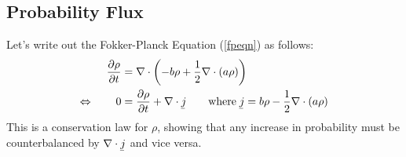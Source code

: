 \documentclass[12pt]{article}
\theoremstyle{plain}
\theoremstyle{definition}
\theoremstyle{remark}
\begin{document}
\subsection{Probability Flux}

Let's write out the Fokker-Planck Equation (\ref{fpeqn}) as follows:
\begin{align*}
  \frac{\partial\rho}{\partial t}
  &= \nabla \cdot \left( -b\rho + \frac{1}{2}\nabla \cdot (a\rho)\right)\\
  \Leftrightarrow\qquad
  0&=
  \frac{\partial\rho}{\partial t}
  + \nabla \cdot \underaccent{\bar}{j}
  \qquad
  \text{where}\;
  \underaccent{\bar}{j} = b\rho - \frac{1}{2}\nabla\cdot(a\rho)
\end{align*}
This is a conservation law for $\rho$, showing that any increase in
probability must be counterbalanced by $\nabla \cdot
\underaccent{\bar}{j}$ and vice versa.









\end{document}
